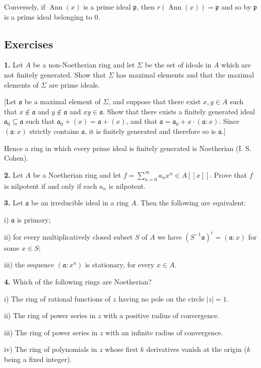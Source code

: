 Conversely, if $\operatorname{Ann}(x)$ is a prime ideal $\mathfrak p$, then $r(\operatorname{Ann}(x))=\mathfrak p$ and so by 
$\mathfrak p$ is a prime ideal belonging to 0.\proofbox

\subsection{Exercises}

\noindent\textbf{1.} Let $A$ be a non-Noetherian ring and let $\Sigma$ be the set of ideals in $A$ which are not
finitely generated.  Show that $\Sigma$ has maximal elements and that the maximal
elements of $\Sigma$ are prime ideals.

[Let $\mathfrak a$ be a maximal element of $\Sigma$, and suppose that there exist $x,y\in A$ such that
$x\notin\mathfrak a$ and $y\notin\mathfrak a$ and $xy\in\mathfrak a$.  Show that there exists a finitely generated ideal
$\mathfrak a_0\subseteq\mathfrak a$ such that $\mathfrak a_0+(x)=\mathfrak a+(x)$, and that $\mathfrak a=\mathfrak a_0+x\cdot(\mathfrak a:x)$.  Since
$(\mathfrak a:x)$ strictly contains $\mathfrak a$, it is finitely generated and therefore so is $\mathfrak a$.]

Hence a ring in which every prime ideal is finitely generated is Noetherian
(I. S. Cohen).

\medskip
\noindent\textbf{2.} Let $A$ be a Noetherian ring and let $f=\sum_{n=0}^\infty a_nx^n\in A[[x]]$.  Prove that $f$ is
nilpotent if and only if each $a_n$ is nilpotent.

\medskip
\noindent\textbf{3.} Let $\mathfrak a$ be an irreducible ideal in a ring $A$.  Then the following are equivalent:

i) $\mathfrak a$ is primary;

ii) for every multiplicatively closed subset $S$ of $A$ we have $(S^{-1}\mathfrak a)^c=(\mathfrak a:x)$ for
some $x\in S$;

iii) the sequence $(\mathfrak a:x^n)$ is stationary, for every $x\in A$.

\medskip
\noindent\textbf{4.} Which of the following rings are Noetherian?

i) The ring of rational functions of $z$ having no pole on the circle $|z|=1$.

ii) The ring of power series in $z$ with a positive radius of convergence.

iii) The ring of power series in $z$ with an infinite radius of convergence.

iv) The ring of polynomials in $z$ whose first $k$ derivatives vanish at the origin
($k$ being a fixed integer).


